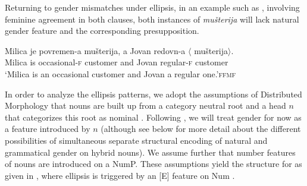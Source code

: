 \documentclass[output=paper,
modfonts,
newtxmath,
hidelinks
]{langscibook}
\begin{document}
\noindent Returning to gender mismatches under ellipsis, in an example such as , involving feminine agreement in both clauses, both instances of \textit{mušterija} will lack natural gender feature and the corresponding presupposition.
		
		\ea\gll Milica je povremen{-a} mušterija, a Jovan redovn{-a} $\langle$\hspace{-2pt} mušterija$\rangle$.\\
		Milica is occasional{-\textsc{f}} customer and Jovan regular{-\textsc{f}} {} customer\\
		\glt `Milica is an occasional customer and Jovan a regular one.'\hfill  \textsc{ffmf}\label{14:ex31}
        \z
		
\noindent		In order to analyze the ellipsis patterns, we adopt the assumptions of Distributed Morphology that nouns are built up from a category neutral root and a head $n$ that categorizes this root as nominal \citep{hallemarantz93,harleynoyer99,kihm05,acquaviva09,kramerbook}. Following \citet{kramerbook}, we will treat gender for now as a feature introduced by $n$ (although see below for more detail about the different possibilities of simultaneous separate structural encoding of natural and grammatical gender on hybrid nouns). We assume further that number features of nouns are introduced on a NumP. These assumptions yield the structure for  as given in , where ellipsis is triggered by an [E] feature on Num \citep[e.g.][]{merchant14,saabliptak16,saab-nomel}. 		
\end{document}
